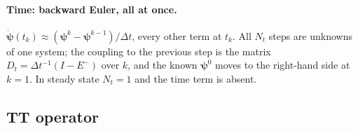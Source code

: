 \documentclass[11pt,a4paper]{article}
\begin{document}
\paragraph{Time: backward Euler, all at once.} $\dot{\bm\psi}(t_k)\approx(\bm\psi^k-\bm\psi^{k-1})/\Delta t$, every other term at $t_k$. All $N_t$ steps are unknowns of one system; the coupling to the previous step is the matrix $D_t=\Delta t^{-1}(I-E^-)$ over $k$, and the known $\bm\psi^0$ moves to the right-hand side at $k=1$. In steady state $N_t=1$ and the time term is absent.

\subsection{TT operator}
\label{sec:operator}
\end{document}
